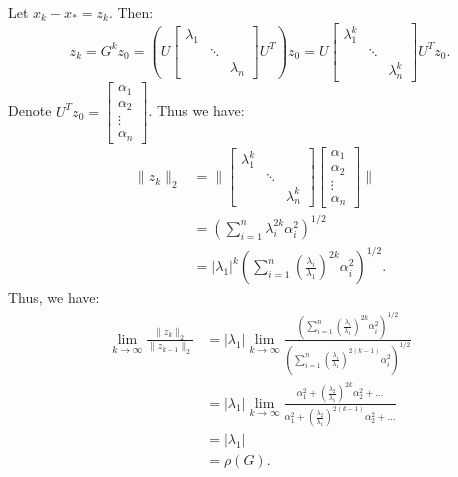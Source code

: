 \documentclass[../main/main.tex]{subfiles}
\begin{document}
Let $x_{k}- x_{*}= z_{k}$. Then: \[
z_{k} = G^{k} z_{0} = \left(U \begin{bmatrix}
  \lambda_{1} && \\
  & \ddots & \\
  && \lambda_{n}
\end{bmatrix}U^{T}\right)z_{0} =  U \begin{bmatrix}
  \lambda_{1}^{k} && \\
  & \ddots & \\
  && \lambda_{n}^{k}
\end{bmatrix}U^{T}z_{0}.
\] Denote $U^{T}z_{0}= \begin{bmatrix}
\alpha_{1} \\ \alpha_{2} \\ \vdots \\ \alpha_{n}
\end{bmatrix}$. Thus we have:
\begin{align*}
  \|z_{k}\|_{2} &= \|\begin{bmatrix}
  \lambda_{1}^{k} && \\
  & \ddots & \\
  && \lambda_{n}^{k}
\end{bmatrix}\begin{bmatrix}
\alpha_{1} \\ \alpha_{2} \\ \vdots \\ \alpha_{n}
\end{bmatrix}
  \|\\ &= \left(\sum_{i=1}^n \lambda_{i}^{2k}\alpha_{i}^2\right)^{1 /2}\\
                &= |\lambda_{1}|^{k}\left(\sum_{i=1}^n \left(\frac{\lambda_{i}}{\lambda_{1}} \right)^{2k}\alpha_{i}^2\right)^{1 /2}
  .\end{align*}
Thus, we have:
\begin{align*}
\lim_{k \to \infty} \frac{\|z_{k}\|_{2}}{\|z_{k-1}\|_{2}} &= |\lambda_{1}| \lim_{k \to \infty} \frac{\left(\sum_{i=1}^n \left(\frac{\lambda_{i}}{\lambda_{1}} \right)^{2k}\alpha_{i}^2\right)^{ 1 / 2 }}{\left(\sum_{i=1}^n \left(\frac{\lambda_{i}}{\lambda_{1}} \right)^{2(k-1)}\alpha_{i}^2\right)^{1 /2}}
  \\ &= |\lambda_{1}| \lim_{k \to \infty} \frac{\alpha_{1}^2 + \left(\frac{\lambda_{2}}{\lambda_{1}} \right)^{2k}\alpha_{2}^2+\ldots}{\alpha_{1}^2 + \left(\frac{\lambda_{2}}{\lambda_{1}} \right)^{2(k-1)}\alpha_{2}^2+\ldots}
  \\ &= |\lambda_{1}| \\ &= \rho(G)
  .\end{align*}
\end{document}
